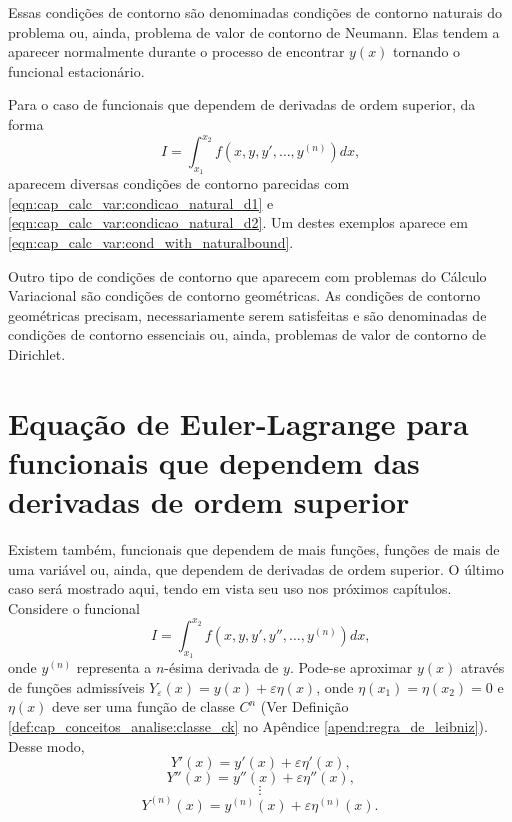 \documentclass[
	12pt,				%
	openright,			%
    twoside,			%
	a4paper,			%
	english,			%
	french,				%
	spanish,			%
	brazil				%
	]{abntex2}
\numberwithin{lema}{chapter}
\numberwithin{teorema}{chapter}
\numberwithin{definicao}{chapter}
\numberwithin{exemplo}{chapter}
\numberwithin{figure}{chapter}
\begin{document}
Essas condições de contorno são denominadas condições de contorno naturais do problema ou, ainda, problema de valor de contorno de Neumann. Elas tendem a aparecer normalmente durante o processo de encontrar $y(x)$ tornando o funcional estacionário.

Para o caso de funcionais que dependem de derivadas de ordem superior, da forma
$$
	I=\int_{x_1}^{x_2} f(x, y, y', \dots, y^{(n)}) dx
	\text{,}
$$
aparecem diversas condições de contorno parecidas com \eqref{eqn:cap_calc_var:condicao_natural_d1} e \eqref{eqn:cap_calc_var:condicao_natural_d2}. Um destes exemplos aparece em \eqref{eqn:cap_calc_var:cond_with_naturalbound}.

Outro tipo de condições de contorno que aparecem com problemas do Cálculo Variacional são condições de contorno geométricas. As condições de contorno geométricas precisam, necessariamente serem satisfeitas e são denominadas de condições de contorno essenciais ou, ainda, problemas de valor de contorno de Dirichlet.

\section{Equação de Euler-Lagrange para funcionais que dependem das derivadas de ordem superior}
\label{sec:eq_euler_lagrange_superior}

Existem também, funcionais que dependem de mais funções, funções de mais de uma variável ou, ainda, que dependem de derivadas de ordem superior. O último caso será mostrado aqui, tendo em vista seu uso nos próximos capítulos. Considere o funcional
\begin{equation}
	\label{eqn:cap_calc_var:funcional_n_derivadas}
	I=\int_{x_1}^{x_2} f(x, y, y', y'', \dots, y^{(n)})dx
	\text{,}
\end{equation}
onde $y^{(n)}$ representa a $n$-ésima derivada de $y$. Pode-se aproximar $y(x)$ através de funções admissíveis $Y_{\varepsilon}(x)=y(x)+\varepsilon \eta (x)$, onde $\eta(x_1)=\eta(x_2)=0$ e $\eta(x)$ deve ser uma função de classe $C^n$ (Ver Definição \ref{def:cap_conceitos_analise:classe_ck} no Apêndice \ref{apend:regra_de_leibniz}). Desse modo,
$$
	Y'(x)=y'(x)+\varepsilon \eta ' (x)
	\text{,}
$$
$$
	Y''(x)=y''(x)+\varepsilon \eta '' (x)
	\text{,}
$$
$$
	\vdots
$$
$$
	Y^{(n)} (x)= y^{(n)}(x)+\varepsilon \eta^{(n)} (x)
	\text{.}
$$
\end{document}
